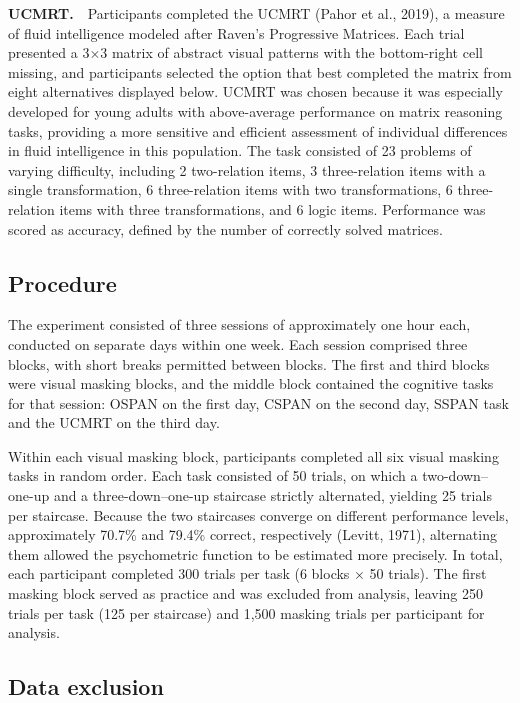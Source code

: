 \documentclass[
  ,man]{apa6}
\begin{document}
\textbf{UCMRT.}\(\quad\)Participants completed the UCMRT (Pahor et al., 2019), a measure of fluid intelligence modeled after Raven's Progressive Matrices. Each trial presented a 3×3 matrix of abstract visual patterns with the bottom-right cell missing, and participants selected the option that best completed the matrix from eight alternatives displayed below. UCMRT was chosen because it was especially developed for young adults with above-average performance on matrix reasoning tasks, providing a more sensitive and efficient assessment of individual differences in fluid intelligence in this population. The task consisted of 23 problems of varying difficulty, including 2 two-relation items, 3 three-relation items with a single transformation, 6 three-relation items with two transformations, 6 three-relation items with three transformations, and 6 logic items. Performance was scored as accuracy, defined by the number of correctly solved matrices.

\subsection{Procedure}\label{procedure}

The experiment consisted of three sessions of approximately one hour each, conducted on separate days within one week. Each session comprised three blocks, with short breaks permitted between blocks. The first and third blocks were visual masking blocks, and the middle block contained the cognitive tasks for that session: OSPAN on the first day, CSPAN on the second day, SSPAN task and the UCMRT on the third day.

Within each visual masking block, participants completed all six visual masking tasks in random order. Each task consisted of 50 trials, on which a two-down--one-up and a three-down--one-up staircase strictly alternated, yielding 25 trials per staircase. Because the two staircases converge on different performance levels, approximately 70.7\% and 79.4\% correct, respectively (Levitt, 1971), alternating them allowed the psychometric function to be estimated more precisely. In total, each participant completed 300 trials per task (6 blocks × 50 trials). The first masking block served as practice and was excluded from analysis, leaving 250 trials per task (125 per staircase) and 1,500 masking trials per participant for analysis.

\subsection{Data exclusion}\label{data-exclusion}
\end{document}
